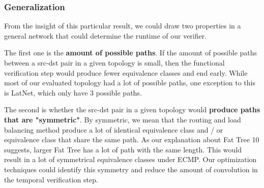\subsubsection{Generalization}
From the insight of this particular result, we could draw two properties in a general network that could 
determine the runtime of our verifier.

The first one is the \textbf{amount of possible paths}.
If the amount of possible paths between a src-dst pair in a given topology is small, then the functional 
verification step would produce fewer equivalence classes and end early.
While most of our evaluated topology had a lot of possible paths, one exception to this is LatNet, which 
only have 3 possible paths.

The second is whether the src-dst pair in a given topology would \textbf{produce paths that are "symmetric"}.
By symmetric, we mean that the routing and load balancing method produce a lot of identical equivalence class 
and / or equivalence class that share the same path.
As our explanation about Fat Tree 10 suggests, larger Fat Tree has a lot of path with the same length.
This would result in a lot of symmetrical equivalence classes under ECMP.
Our optimization techniques could identify this symmetry and reduce the amount of convolution in the temporal 
verification step.

